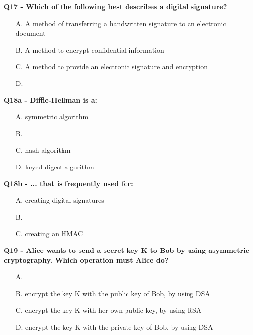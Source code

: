 \textbf{Q17 - Which of the following best describes a digital signature?}
\begin{enumerate}
    \item[A.] A method of transferring a handwritten signature to an electronic document
    \item[B.] A method to encrypt confidential information
    \item[C.] A method to provide an electronic signature and encryption
    \item[D.] 
\end{enumerate}

\textbf{Q18a - Diffie-Hellman is a:}
\begin{enumerate}
    \item[A.] symmetric algorithm
    \item[B.] 
    \item[C.] hash algorithm
    \item[D.] keyed-digest algorithm
\end{enumerate}

\textbf{Q18b - ... that is frequently used for:}
\begin{enumerate}
    \item[A.] creating digital signatures
    \item[B.] 
    \item[C.] creating an HMAC
\end{enumerate}

\textbf{Q19 - Alice wants to send a secret key K to Bob by using asymmetric cryptography. Which operation must Alice do?}
\begin{enumerate}
    \item[A.] 
    \item[B.] encrypt the key K with the public key of Bob, by using DSA
    \item[C.] encrypt the key K with her own public key, by using RSA
    \item[D.] encrypt the key K with the private key of Bob, by using DSA
\end{enumerate}

